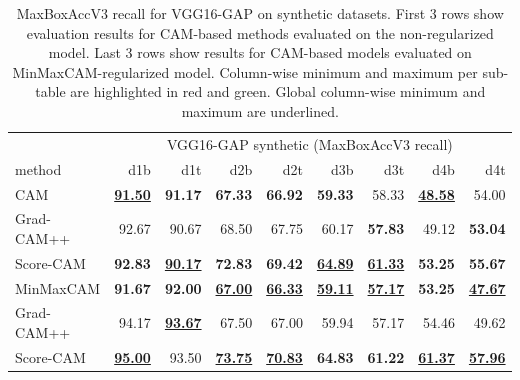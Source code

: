 \begin{table}[h]
\centering
\begin{tabular}{lrrrrrrrr}
\toprule
& \multicolumn{8}{c}{VGG16-GAP synthetic (MaxBoxAccV3 recall)} \\
method & d1b & d1t & d2b & d2t & d3b & d3t & d4b & d4t \\
\cmidrule(lr){1-1} \cmidrule(lr){2-9} 
CAM & \color{purple} \bfseries  \underline{91.50} & \color{teal} \bfseries 91.17 & \color{purple} \bfseries 67.33 & \color{purple} \bfseries 66.92 & \color{purple} \bfseries 59.33 & 58.33 & \color{purple} \bfseries \underline{48.58} & 54.00 \\
Grad-CAM++ & 92.67 & 90.67 & 68.50 & 67.75 & 60.17 & \color{purple} \bfseries 57.83 & 49.12 & \color{purple} \bfseries 53.04 \\
Score-CAM & \color{teal} \bfseries 92.83 & \color{purple} \bfseries \underline{90.17} & \color{teal} \bfseries 72.83 & \color{teal} \bfseries 69.42 & \color{teal} \bfseries \underline{64.89} & \color{teal} \bfseries \underline{61.33} & \color{teal} \bfseries 53.25 & \color{teal} \bfseries 55.67 \\
\cmidrule(lr){1-1} \cmidrule(lr){2-9} 
MinMaxCAM & \color{purple} \bfseries 91.67 & \color{purple} \bfseries 92.00 & \color{purple} \bfseries \underline{67.00} & \color{purple} \bfseries \underline{66.33} & \color{purple} \bfseries \underline{59.11} & \color{purple} \bfseries \underline{57.17} & \color{purple} \bfseries 53.25 & \color{purple} \bfseries \underline{47.67} \\
Grad-CAM++ & 94.17 & \color{teal} \bfseries \underline{93.67} & 67.50 & 67.00 & 59.94 & 57.17 & 54.46 & 49.62 \\
Score-CAM & \color{teal} \bfseries \underline{95.00} & 93.50 & \color{teal} \bfseries \underline{73.75} & \color{teal} \bfseries \underline{70.83} & \color{teal} \bfseries 64.83 & \color{teal} \bfseries 61.22 & \color{teal} \bfseries \underline{61.37} & \color{teal} \bfseries \underline{57.96} \\
\bottomrule
\end{tabular}
\caption[MaxBoxAccV3 recall for VGG16-GAP on synthetic datasets]{MaxBoxAccV3 recall for VGG16-GAP on synthetic datasets. First 3 rows show evaluation results for CAM-based methods evaluated on the non-regularized model. Last 3 rows show results for CAM-based models evaluated on MinMaxCAM-regularized model. Column-wise minimum and maximum per sub-table are highlighted in red and green. Global column-wise minimum and maximum are underlined.}
\label{tab:maxboxaccv3_recall_vgg16_gap_synthetic}
\end{table}

